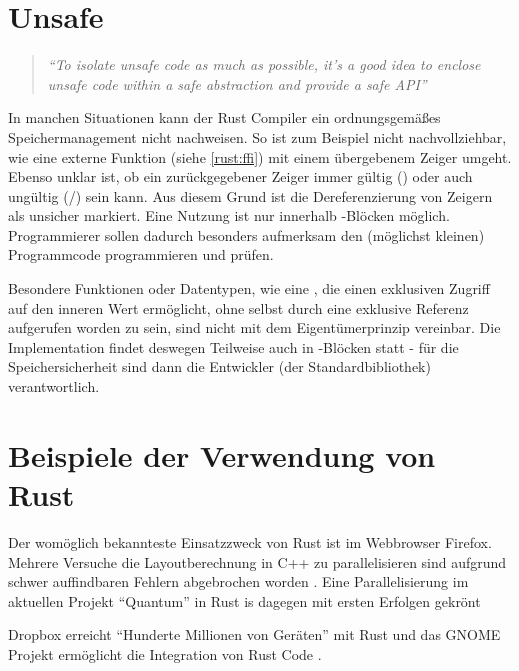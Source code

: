 \section{Unsafe}

\begin{quotation}
	\textit{\enquote{To isolate unsafe code as much as possible, it’s a good idea to enclose unsafe code within a safe abstraction and provide a safe API}}
	\cite[The Rust Programming Language - Unsafe Rust]{rust:book:unsafe}
\end{quotation}

In manchen Situationen kann der Rust Compiler ein ordnungsgemäßes Speichermanagement nicht nachweisen.
So ist zum Beispiel nicht nachvollziehbar, wie eine externe Funktion (siehe \autoref{rust:ffi}) mit einem übergebenem Zeiger umgeht.
Ebenso unklar ist, ob ein zurückgegebener Zeiger immer gültig () oder auch ungültig (/) sein kann.
Aus diesem Grund ist die Dereferenzierung von Zeigern als unsicher markiert.
Eine Nutzung ist nur innerhalb -Blöcken möglich.
Programmierer sollen dadurch besonders aufmerksam den (möglichst kleinen) Programmcode programmieren und prüfen.

Besondere Funktionen oder Datentypen, wie eine , die einen exklusiven Zugriff auf den inneren Wert ermöglicht, ohne selbst durch eine exklusive Referenz aufgerufen worden zu sein, sind nicht mit dem Eigentümerprinzip vereinbar.
Die Implementation findet deswegen Teilweise auch in -Blöcken statt -
für die Speichersicherheit sind dann die Entwickler (der Standardbibliothek) verantwortlich.


\section{Beispiele der Verwendung von Rust}

Der womöglich bekannteste Einsatzzweck von Rust ist im Webbrowser Firefox.
Mehrere Versuche die Layoutberechnung in C++ zu parallelisieren sind aufgrund schwer auffindbaren Fehlern abgebrochen worden \cite{rust:example:firefox}.
Eine Parallelisierung im aktuellen Projekt \enquote{Quantum} in Rust is dagegen mit ersten Erfolgen gekrönt \cite{rust:example:firefox_heise}

Dropbox erreicht \enquote{Hunderte Millionen von Geräten} mit Rust und das GNOME Projekt ermöglicht die Integration von Rust Code \cite{rust:example:two_years}.

